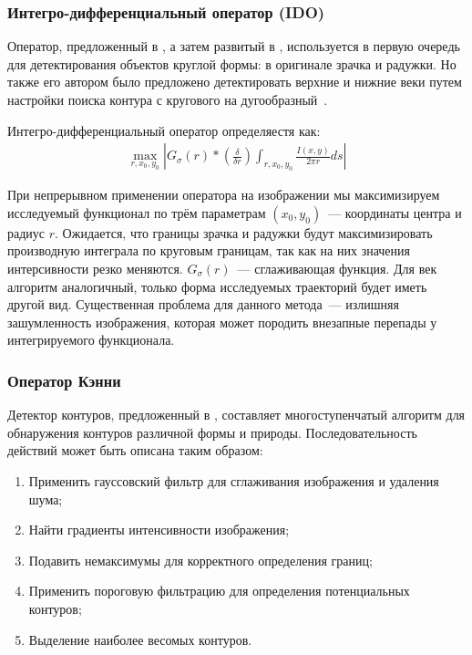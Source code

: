 \documentclass[12pt,a4paper]{article} %
\begin{document}
\subsubsection{Интегро-дифференциальный оператор (IDO)}

Оператор, предложенный в \cite{Daugman2}, а затем развитый в \cite{Daugman4, Daugman}, используется в первую очередь для детектирования объектов круглой формы: в оригинале зрачка и радужки. Но также его автором было предложено детектировать верхние и нижние веки путем настройки поиска контура с кругового на дугообразный~\cite{Daugman}.

Интегро-дифференциальный оператор определяестя как:
\begin{gather}\label{ido}
	\max_{r, x_0, y_0}{\left| G_\sigma(r)*\left(\frac{\delta}{\delta r}\right)\int_{r, x_0, y_0}{\frac{I(x,y)}{2\pi r}ds}\right|}
\end{gather}

При непрерывном применении оператора на изображении мы максимизируем исследуемый функционал по трём параметрам $(x_0, y_0)$~--- координаты центра и радиус $r$. Ожидается, что границы зрачка и радужки будут максимизировать производную интеграла по круговым границам, так как на них значения интерсивности резко меняются. $G_\sigma(r)$~--- сглаживающая функция. Для век алгоритм аналогичный, только форма исследуемых траекторий будет иметь другой вид. Существенная проблема для данного метода~--- излишняя зашумленность изображения, которая может породить внезапные перепады у интегрируемого функционала.


\subsubsection{Оператор Кэнни}

Детектор контуров, предложенный в \cite{Canny}, составляет многоступенчатый алгоритм для обнаружения контуров различной формы и природы. Последовательность действий может быть описана таким образом:

\begin{enumerate}
	\item Применить гауссовский фильтр для сглаживания изображения и удаления шума;
	\item Найти градиенты интенсивности изображения;
	\item Подавить немаксимумы для корректного определения границ;
	\item Применить пороговую фильтрацию для определения потенциальных контуров;
	\item Выделение наиболее весомых контуров.
\end{enumerate}
\end{document}
